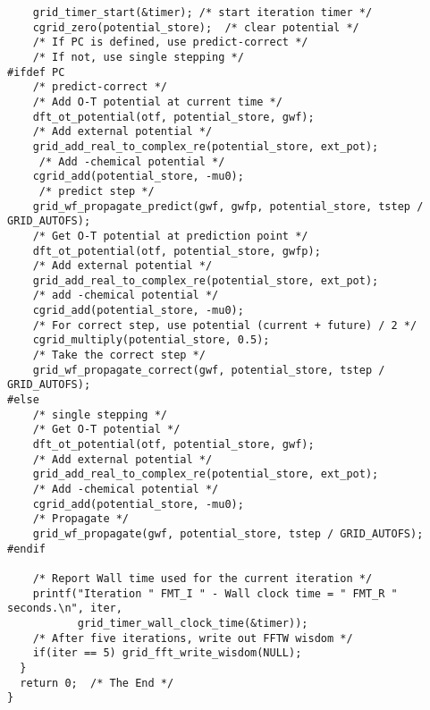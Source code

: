 \documentclass[12pt,letterpaper]{report}
\begin{document}
\begin{verbatim}
    grid_timer_start(&timer); /* start iteration timer */
    cgrid_zero(potential_store);  /* clear potential */
    /* If PC is defined, use predict-correct */
    /* If not, use single stepping */
#ifdef PC
    /* predict-correct */
    /* Add O-T potential at current time */
    dft_ot_potential(otf, potential_store, gwf);
    /* Add external potential */
    grid_add_real_to_complex_re(potential_store, ext_pot);
     /* Add -chemical potential */ 
    cgrid_add(potential_store, -mu0);
     /* predict step */
    grid_wf_propagate_predict(gwf, gwfp, potential_store, tstep / GRID_AUTOFS);
    /* Get O-T potential at prediction point */
    dft_ot_potential(otf, potential_store, gwfp);
    /* Add external potential */
    grid_add_real_to_complex_re(potential_store, ext_pot);
    /* add -chemical potential */
    cgrid_add(potential_store, -mu0);    
    /* For correct step, use potential (current + future) / 2 */          
    cgrid_multiply(potential_store, 0.5);
    /* Take the correct step */
    grid_wf_propagate_correct(gwf, potential_store, tstep / GRID_AUTOFS); 
#else
    /* single stepping */
    /* Get O-T potential */
    dft_ot_potential(otf, potential_store, gwf);
    /* Add external potential */
    grid_add_real_to_complex_re(potential_store, ext_pot);
    /* Add -chemical potential */
    cgrid_add(potential_store, -mu0);
    /* Propagate */             
    grid_wf_propagate(gwf, potential_store, tstep / GRID_AUTOFS);  
#endif

    /* Report Wall time used for the current iteration */
    printf("Iteration " FMT_I " - Wall clock time = " FMT_R " seconds.\n", iter,
           grid_timer_wall_clock_time(&timer));
    /* After five iterations, write out FFTW wisdom */
    if(iter == 5) grid_fft_write_wisdom(NULL);
  }
  return 0;  /* The End */
}
\end{verbatim}
\end{document}
